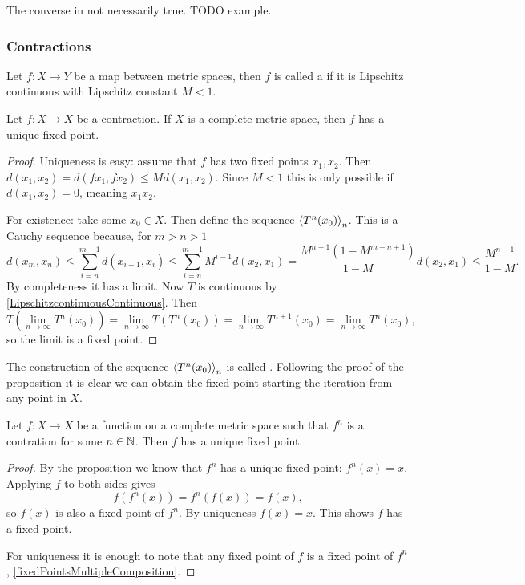 The converse in not necessarily true. TODO example.

\subsubsection{Contractions}
\begin{definition}
Let $f: X\to Y$ be a map between metric spaces, then $f$ is called a  if it is Lipschitz continuous with Lipschitz constant $M < 1$.
\end{definition}

\begin{proposition} \label{contractionFixedPoint}
Let $f: X\to X$ be a contraction. If $X$ is a complete metric space, then $f$ has a unique fixed point.
\end{proposition}
\begin{proof}
Uniqueness is easy: assume that $f$ has two fixed points $x_1, x_2$. Then $d(x_1,x_2) = d(fx_1, fx_2) \leq M d(x_1,x_2)$. Since $M < 1$ this is only possible if $d(x_1,x_2) = 0$, meaning $x_1  x_2$.

For existence: take some $x_0\in X$. Then define the sequence $\left\langle T^n(x_0) \right\rangle_n$. This is a Cauchy sequence because, for $m>n>1$
\[ d(x_m,x_n) \leq \sum_{i=n}^{m-1}d(x_{i+1}, x_i) \leq \sum^{m-1}_{i=n}M^{i-1}d(x_2,x_1) = \frac{M^{n-1}(1-M^{m-n+1})}{1-M}d(x_2,x_1) \leq \frac{M^{n-1}}{1-M}. \]
By completeness it has a limit. Now $T$ is continuous by \ref{LipschitzcontinuousContinuous}. Then
\[ T\left(\lim_{n\to \infty} T^n(x_0)\right) = \lim_{n\to \infty}T(T^n(x_0)) = \lim_{n\to \infty}T^{n+1}(x_0) = \lim_{n\to \infty} T^n(x_0),  \]
so the limit is a fixed point.
\end{proof}

The construction of the sequence $\left\langle T^n(x_0) \right\rangle_n$ is called . Following the proof of the proposition it is clear we can obtain the fixed point starting the iteration from any point in $X$.

\begin{corollary}
Let $f: X\to X$ be a function on a complete metric space such that $f^n$ is a contration for some $n\in \mathbb{N}$. Then $f$ has a unique fixed point.
\end{corollary}
\begin{proof}
By the proposition we know that $f^n$ has a unique fixed point: $f^n(x) = x$. Applying $f$ to both sides gives
\[ f(f^n(x)) = f^n(f(x)) = f(x), \]
so $f(x)$ is also a fixed point of $f^n$. By uniqueness $f(x) = x$. This shows $f$ has a fixed point.

For uniqueness it is enough to note that any fixed point of $f$ is a fixed point of $f^n$, \ref{fixedPointsMultipleComposition}.
\end{proof}

